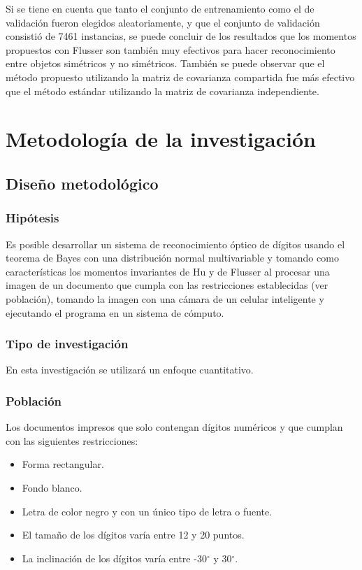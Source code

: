 \documentclass[a4paper, 11pt, oneside]{report}
\begin{document}
Si se tiene en cuenta que tanto el conjunto de entrenamiento como el de validación fueron elegidos aleatoriamente, y que el conjunto de validación consistió de 7461 instancias, se puede concluir de los resultados que los momentos propuestos con Flusser son también muy efectivos para hacer reconocimiento entre objetos simétricos y no simétricos. También se puede observar que el método propuesto utilizando la matriz de covarianza compartida fue más efectivo que el método estándar utilizando la matriz de covarianza independiente.


\chapter{Metodología de la investigación}
\label{chap:metodology}

\section{Diseño metodológico}

\subsection{Hipótesis}

Es posible desarrollar un sistema de reconocimiento óptico de dígitos usando el teorema de Bayes con una distribución normal multivariable y tomando como características los momentos invariantes de Hu y de Flusser al procesar una imagen de un documento que cumpla con las restricciones establecidas (ver población), tomando la imagen con una cámara de un celular inteligente y ejecutando el programa en un sistema de cómputo.
	
\subsection{Tipo de investigación}

En esta investigación se utilizará un enfoque cuantitativo.

\subsection{Población}
\label{sect:population}

Los documentos impresos que solo contengan dígitos numéricos y que cumplan con las siguientes restricciones:

\begin{itemize}

	\item Forma rectangular.

	\item Fondo blanco.

	\item Letra de color negro y con un único tipo de letra o fuente.

	\item El tamaño de los dígitos varía entre 12 y 20 puntos.

	\item La inclinación de los dígitos varía entre -30$^{\circ}$ y 30$^{\circ}$.

\end{itemize}
\end{document}
